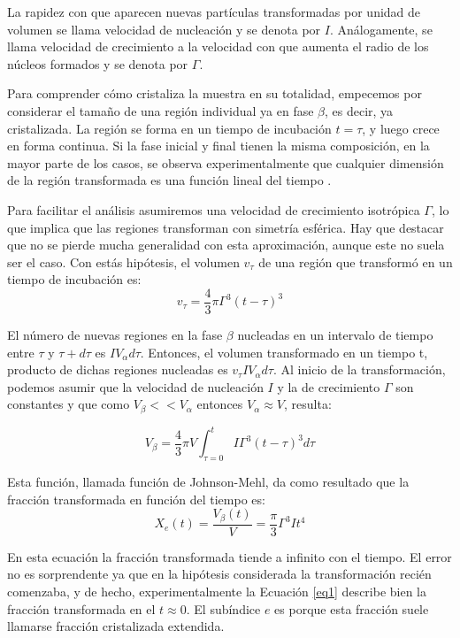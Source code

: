 \documentclass[12pt]{article}
\theoremstyle{definition}
\theoremstyle{remark}
\begin{document}
La rapidez con que aparecen nuevas partículas transformadas por unidad de volumen se llama velocidad de nucleación y se denota por $I$. Análogamente, se llama velocidad de crecimiento a la velocidad con que aumenta el radio de los núcleos formados y se denota por $\Gamma$.

Para comprender cómo cristaliza la muestra en su totalidad, empecemos por
considerar el tamaño de una región individual ya en fase $\beta$, es decir, ya cristalizada. La región se forma en un tiempo de incubación $t=\tau$, y luego crece en forma continua. Si la fase inicial y final tienen la misma composición, en la mayor parte de los casos, se observa experimentalmente que cualquier dimensión de la región transformada es una función lineal del tiempo \cite{Transformations2002}.

Para facilitar el análisis asumiremos una velocidad de crecimiento isotrópica $\Gamma$, lo que implica que las regiones transforman con simetría esférica. Hay que destacar que no se pierde mucha generalidad con esta aproximación, aunque este no suela ser el caso. Con estás hipótesis, el volumen $v_\tau$ de una región que transformó en un tiempo de incubación es:
\begin{equation}
	v_\tau = \frac{4}{3}\pi \Gamma^3(t-\tau)^3
\end{equation}

El número de nuevas regiones en la fase $\beta$ nucleadas en un intervalo de tiempo entre $\tau$ y $\tau + d\tau$ es $IV_\alpha d\tau$. Entonces, el volumen transformado en un tiempo t, producto de dichas regiones nucleadas es $v_\tau IV_\alpha d\tau$. Al inicio de la transformación, podemos asumir que la velocidad de nucleación $I$ y la de crecimiento $\Gamma$ son constantes y que como $V_\beta << V_\alpha$ entonces $V_\alpha \approx V$, resulta:

\begin{equation}
\label{integral}
	V_\beta = \frac{4}{3}\pi V \int_{\tau = 0}^{t} I\Gamma^3(t-\tau)^3d\tau
\end{equation}

Esta función, llamada función de Johnson-Mehl, da como resultado que la fracción transformada en función del tiempo es:
\begin{equation}
\label{eq1}
	X_e(t) = \frac{V_\beta (t)}{V} = \frac{\pi}{3}\Gamma^3 I t^4
\end{equation}

En esta ecuación la fracción transformada tiende a infinito con el tiempo. El error no es sorprendente ya que en la hipótesis considerada la transformación recién comenzaba, y de hecho, experimentalmente la Ecuación \ref{eq1} describe bien la fracción transformada en el $t \approx 0$. El subíndice $e$ es porque esta fracción suele llamarse fracción cristalizada extendida.
\end{document}

